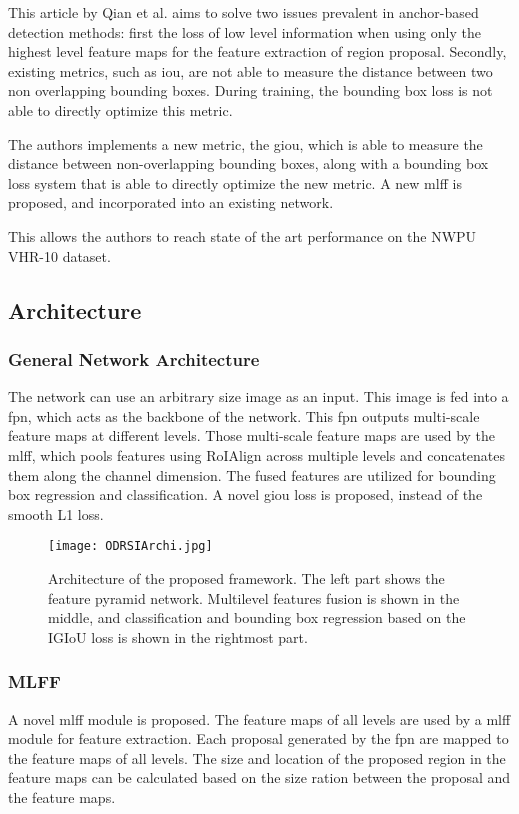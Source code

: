 
This article by Qian et al. aims to solve two issues prevalent in anchor-based detection methods:
first the loss of low level information when using only the highest level feature maps for the feature extraction of region proposal.
Secondly, existing metrics, such as \gls{iou}, are not able to measure the distance between two non overlapping bounding boxes. During training, the bounding box loss is not able to directly optimize this metric. 

The authors implements a new metric, the \gls{giou}, which is able to measure the distance between non-overlapping bounding boxes, along with a bounding box loss system that is able to directly optimize the new metric. A new \gls{mlff} is proposed, and incorporated into an existing network.

This allows the authors to reach state of the art performance on the NWPU VHR-10 dataset\cite{nwpu}.

\subsection{Architecture}
\subsubsection{General Network Architecture}
The network can use an arbitrary size image as an input. This image is fed into a \gls{fpn}, which acts as the backbone of the network. This \gls{fpn} outputs multi-scale feature maps at different levels. Those multi-scale feature maps are used by the \gls{mlff}, which pools features using RoIAlign\cite{resNet} across multiple levels and concatenates them along the channel dimension. The fused features are utilized for bounding box regression and classification. A novel \gls{giou} loss is proposed, instead of the smooth L1 loss.


\begin{figure}[h!]
  \centering
  \texttt{[image: ODRSIArchi.jpg]}
	\caption[General Architecture of the ODRSI]{Architecture of the proposed framework. The left part shows the feature pyramid network. Multilevel features fusion is shown in the middle, and classification and bounding box regression based on the IGIoU loss is shown in the rightmost part.}
  \label{fig:archiQian}
\end{figure}

\subsubsection{MLFF}
A novel \gls{mlff} module is proposed. The feature maps of all levels are used by a \gls{mlff} module for feature extraction. Each proposal generated by the \gls{fpn} are mapped to the feature maps of all levels. The size and location of the proposed region in the feature maps can be calculated based on the size ration between the proposal and the feature maps. 

